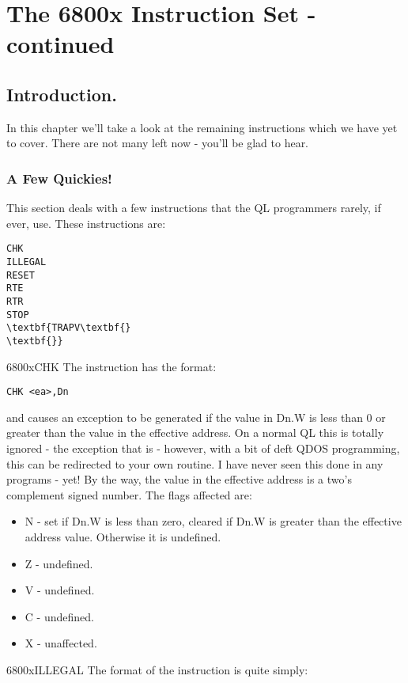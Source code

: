 \chapter{The 6800x Instruction Set -{} continued}

\section{Introduction.}
\label{ch5-intro}%

In this chapter we'll take a look at the remaining instructions
    which we have yet to cover. There are not many left now -{} you'll be glad
    to hear.

\subsection{A Few Quickies!}
\label{ch5-quickies}%

This section deals with a few instructions that the QL programmers
      rarely, if ever, use. These instructions are:

\begin{lstlisting}[firstnumber=1,frame=none,numbers=none]
CHK
ILLEGAL
RESET
RTE
RTR
STOP
\textbf{TRAPV\textbf{}
\textbf{}}\end{lstlisting}
\mc6800x{CHK}
The  instruction has the format:

\begin{lstlisting}[firstnumber=1,]
          CHK <ea>,Dn
\end{lstlisting}

and causes an exception to be generated if the value in Dn.W is
      less than 0 or greater than the value in the effective address. On a
      normal QL this is totally ignored -{} the exception that is -{} however,
      with a bit of deft QDOS programming, this can be redirected to your own
      routine. I have never seen this done in any programs -{} yet! By the way,
      the value in the effective address is a two's complement signed number.
      The flags affected are:
\begin{itemize}[itemsep=0pt]

\item{}N -{} set if Dn.W is less than zero, cleared if Dn.W is greater
          than the effective address value. Otherwise it is undefined.


\item{}Z -{} undefined.


\item{}V -{} undefined.


\item{}C -{} undefined.


\item{}X -{} unaffected.

\end{itemize}
\mc6800x{ILLEGAL}
The format of the  instruction is quite simply:

